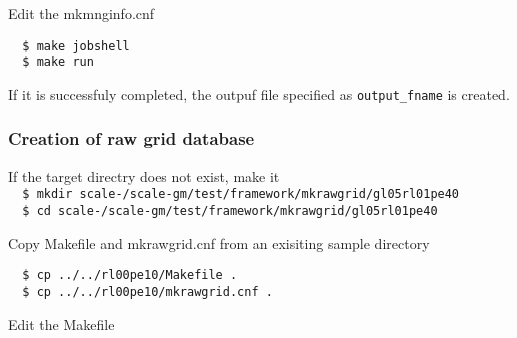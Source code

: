 Edit the mkmnginfo.cnf

\vspace{-4mm}
\begin{verbatim}
  $ make jobshell
  $ make run
\end{verbatim}
If it is successfuly completed, the outpuf file specified as {\verb|output_fname|} is created.


\subsubsection{Creation of raw grid database}
If the target directry does not exist, make it \\

\verb|  $ mkdir scale-|{\version}\verb|/scale-gm/test/framework/mkrawgrid/gl05rl01pe40| \\

\verb|  $ cd scale-|{\version}\verb|/scale-gm/test/framework/mkrawgrid/gl05rl01pe40|

Copy Makefile and mkrawgrid.cnf from an exisiting sample directory \\

\begin{verbatim}
  $ cp ../../rl00pe10/Makefile .
  $ cp ../../rl00pe10/mkrawgrid.cnf .
\end{verbatim}

Edit the Makefile

